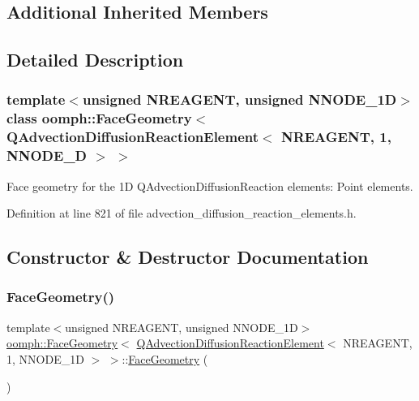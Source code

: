 \subsection*{Additional Inherited Members}


\subsection{Detailed Description}
\subsubsection*{template$<$unsigned N\+R\+E\+A\+G\+E\+NT, unsigned N\+N\+O\+D\+E\+\_\+1D$>$\newline
class oomph\+::\+Face\+Geometry$<$ Q\+Advection\+Diffusion\+Reaction\+Element$<$ N\+R\+E\+A\+G\+E\+N\+T, 1, N\+N\+O\+D\+E\+\_\+D $>$ $>$}

Face geometry for the 1D Q\+Advection\+Diffusion\+Reaction elements\+: Point elements. 

Definition at line 821 of file advection\+\_\+diffusion\+\_\+reaction\+\_\+elements.\+h.



\subsection{Constructor \& Destructor Documentation}
\mbox{\label{classoomph_1_1FaceGeometry_3_01QAdvectionDiffusionReactionElement_3_01NREAGENT_00_011_00_01NNODE__1D_01_4_01_4_a376966a8608d69ee11733d99c748344c}} 
\subsubsection{\texorpdfstring{Face\+Geometry()}{FaceGeometry()}}
{\footnotesize\ttfamily template$<$unsigned N\+R\+E\+A\+G\+E\+NT, unsigned N\+N\+O\+D\+E\+\_\+1D$>$ \\
\hyperlink{classoomph_1_1FaceGeometry}{oomph\+::\+Face\+Geometry}$<$ \hyperlink{classoomph_1_1QAdvectionDiffusionReactionElement}{Q\+Advection\+Diffusion\+Reaction\+Element}$<$ N\+R\+E\+A\+G\+E\+NT, 1, N\+N\+O\+D\+E\+\_\+1D $>$ $>$\+::\hyperlink{classoomph_1_1FaceGeometry}{Face\+Geometry} (\begin{DoxyParamCaption}{ }\end{DoxyParamCaption})\hspace{0.3cm}{\ttfamily [inline]}}



